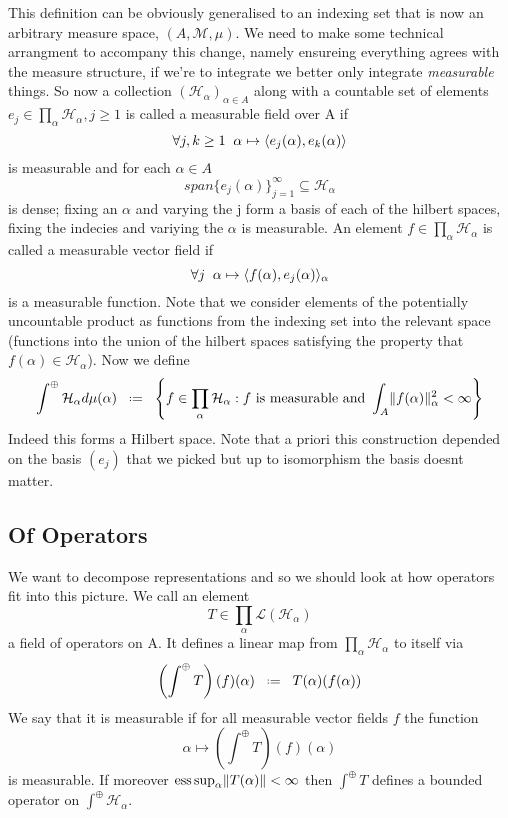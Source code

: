 \documentclass[10pt, openany]{book}
\numberwithin{equation}{section}
\theoremstyle{definition}
\theoremstyle{remark}
\numberwithin{equation}{section}
\begin{document}
    This definition can be obviously generalised to an indexing set that is now an arbitrary measure space, \((A, \mathcal{M}, \mu)\). We need to make some technical arrangment to accompany this change, namely ensureing everything agrees with the measure structure, if we're to integrate we better only integrate \textit{measurable} things. So now a collection \((\mathcal{H}_\alpha)_{\alpha\in A}\) along with a countable set of elements \(e_j \in \prod_\alpha \mathcal{H}_\alpha, j\geq 1\) is called a measurable field over A if 
    \[\forall j,k\geq 1 \;\; \alpha \mapsto \langle e_j(\alpha), e_k(\alpha)\rangle\]
    is measurable and for each \(\alpha \in A\) 
    \[span\{e_j(\alpha)\}_{j=1}^\infty \subseteq \mathcal{H}_\alpha\]
    is dense; fixing an \(\alpha\) and varying the j form a basis of each of the hilbert spaces, fixing the indecies and variying the \(\alpha\) is measurable. An element \(f \in \prod_\alpha \mathcal{H}_\alpha\) is called a measurable vector field if 
    \[\forall j \;\; \alpha \mapsto \langle f(\alpha), e_j(\alpha)\rangle_\alpha\]
    is a measurable function. Note that we consider elements of the potentially uncountable product as functions from the indexing set into the relevant space (functions into the union of the hilbert spaces satisfying the property that \(f(\alpha)\in \mathcal{H}_\alpha\)). Now we define 
    \[\int^\oplus \mathcal{H}_\alpha d\mu(\alpha) \defeq \left\{f\in \prod_\alpha \mathcal{H}_\alpha : f \text{ is measurable and } \int_A \norm{f(\alpha)}_\alpha^2 < \infty \right\}\] 
    Indeed this forms a Hilbert space. Note that a priori this construction depended on the basis \((e_j)\) that we picked but up to isomorphism the basis doesnt matter. 

    \subsection{Of Operators}
    We want to decompose representations and so we should look at how operators fit into this picture. We call an element 
    \[T\in \prod_\alpha \mathcal{L(H_\alpha)}\]
    a field of operators on A. It defines a linear map from \(\prod_\alpha \mathcal{H}_\alpha\) to itself via 
    \[ \left(\int^\oplus T\right)(f)(\alpha) \defeq T(\alpha)(f(\alpha)) \]
    We say that it is measurable if for all measurable vector fields \(f\) the function 
    \[\alpha \mapsto \left(\int^\oplus T\right)(f)(\alpha)\]
    is measurable. If moreover \(\mathrm{ess}\sup_\alpha \lVert T(\alpha) \rVert <\infty\) then \(\int^\oplus T\) defines a bounded operator on \(\int^\oplus \mathcal{H}_\alpha\).
\end{document}
